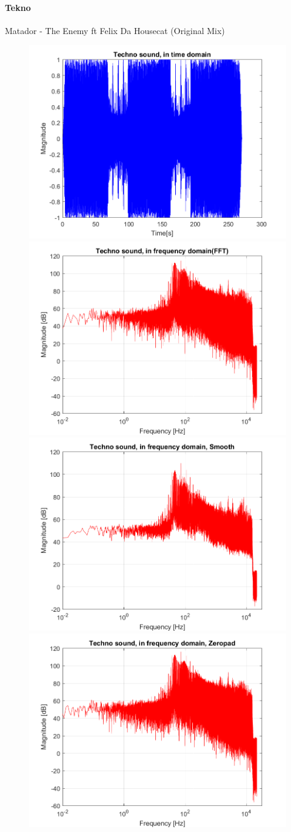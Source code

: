 \paragraph{Tekno}
Matador - The Enemy ft Felix Da Housecat (Original Mix)

\begin{figure}[htb]
	\centering
	{\includegraphics[width=0.45\linewidth]{code/Techno_figure1.png}}
	{\includegraphics[width=0.45\linewidth]{code/Techno_figure2.png}}
	{\includegraphics[width=0.45\linewidth]{code/Techno_figure3.png}}
	{\includegraphics[width=0.45\linewidth]{code/Techno_figure4.png}}

\end{figure}
